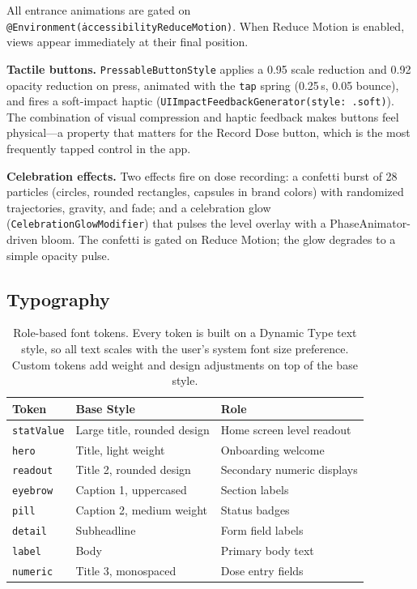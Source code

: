 \documentclass[11pt,a4paper]{article}
\newcommand{\code}[1]{\texttt{\small #1}}
\begin{document}
All entrance animations are gated on
\code{@Environment(\.accessibilityReduceMotion)}. When Reduce Motion is
enabled, views appear immediately at their final position.

\textbf{Tactile buttons.} \code{PressableButtonStyle} applies a 0.95
scale reduction and 0.92 opacity reduction on press, animated with the
\code{tap} spring (0.25\,s, 0.05 bounce), and fires a soft-impact haptic
(\code{UIImpactFeedbackGenerator(style: .soft)}). The combination of
visual compression and haptic feedback makes buttons feel physical---a
property that matters for the Record Dose button, which is the most
frequently tapped control in the app.

\textbf{Celebration effects.} Two effects fire on dose recording: a
confetti burst of 28 particles (circles, rounded rectangles, capsules in
brand colors) with randomized trajectories, gravity, and fade; and a
celebration glow (\code{CelebrationGlowModifier}) that pulses the level
overlay with a PhaseAnimator-driven bloom. The confetti is gated on
Reduce Motion; the glow degrades to a simple opacity pulse.

\subsection{Typography}
\label{sec:typography}

\begin{table}[h]
\centering
\small
\begin{tabular}{@{}lll@{}}
\toprule
\textbf{Token} & \textbf{Base Style} & \textbf{Role} \\
\midrule
\code{statValue}  & Large title, rounded design & Home screen level readout \\
\code{hero}       & Title, light weight        & Onboarding welcome \\
\code{readout}    & Title 2, rounded design     & Secondary numeric displays \\
\code{eyebrow}    & Caption 1, uppercased       & Section labels \\
\code{pill}       & Caption 2, medium weight    & Status badges \\
\code{detail}     & Subheadline                 & Form field labels \\
\code{label}      & Body                        & Primary body text \\
\code{numeric}    & Title 3, monospaced         & Dose entry fields \\
\bottomrule
\end{tabular}
\caption{Role-based font tokens. Every token is built on a Dynamic Type
text style, so all text scales with the user's system font size
preference. Custom tokens add weight and design adjustments on top of the
base style.}
\label{tab:typography}
\end{table}
\end{document}

